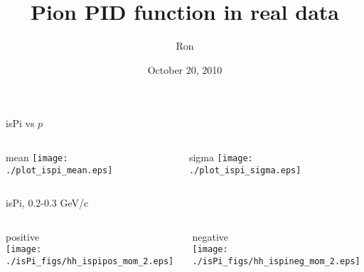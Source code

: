 \documentclass[compress]{beamer} %
\title[20 October 2010 - Slide \insertframenumber]{Pion PID function in real data}
\author[Ron]{Ron}
\date{October 20, 2010}
\begin{document}
\begin{frame}
\titlepage
\end{frame}








\begin{frame}{isPi vs $p$}
\begin{columns}
\begin{column}{.5\linewidth}
mean
\texttt{[image: ./plot\_ispi\_mean.eps]} \\
\end{column}
\begin{column}{.5\linewidth}
sigma
\texttt{[image: ./plot\_ispi\_sigma.eps]} \\
\end{column}
\end{columns}
\end{frame}




\begin{frame}{isPi, 0.2-0.3 GeV/c}
\begin{columns}
\begin{column}{.5\linewidth}
positive \\
\texttt{[image: ./isPi\_figs/hh\_ispipos\_mom\_2.eps]} \\
\end{column}
\begin{column}{.5\linewidth}
negative \\
\texttt{[image: ./isPi\_figs/hh\_ispineg\_mom\_2.eps]} \\
\end{column}
\end{columns}
\end{frame}

\end{document}
